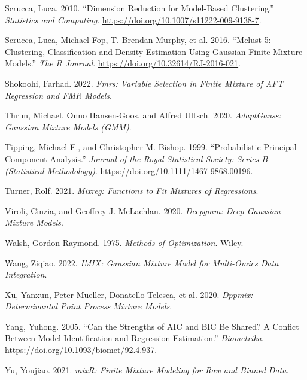 \begin{CSLReferences}{1}{0}
\leavevmode{}%
Scrucca, Luca. 2010. {``Dimension Reduction for Model-Based Clustering.''} \emph{Statistics and Computing}. \url{https://doi.org/10.1007/s11222-009-9138-7}.

\leavevmode{}%
Scrucca, Luca, Michael Fop, T. Brendan Murphy, et al. 2016. {``Mclust 5: {Clustering}, {Classification} and {Density Estimation Using Gaussian Finite Mixture Models}.''} \emph{The R Journal}. \url{https://doi.org/10.32614/RJ-2016-021}.

\leavevmode{}%
Shokoohi, Farhad. 2022. \emph{Fmrs: Variable Selection in Finite Mixture of AFT Regression and FMR Models}.

\leavevmode{}%
Thrun, Michael, Onno Hansen-Goos, and Alfred Ultsch. 2020. \emph{AdaptGauss: Gaussian Mixture Models (GMM)}.

\leavevmode{}%
Tipping, Michael E., and Christopher M. Bishop. 1999. {``Probabilistic {Principal} {Component} {Analysis}.''} \emph{Journal of the Royal Statistical Society: Series B (Statistical Methodology)}. \url{https://doi.org/10.1111/1467-9868.00196}.

\leavevmode{}%
Turner, Rolf. 2021. \emph{Mixreg: Functions to Fit Mixtures of Regressions}.

\leavevmode{}%
Viroli, Cinzia, and Geoffrey J. McLachlan. 2020. \emph{Deepgmm: Deep Gaussian Mixture Models}.

\leavevmode{}%
Walsh, Gordon Raymond. 1975. \emph{Methods of {Optimization}}. Wiley.

\leavevmode{}%
Wang, Ziqiao. 2022. \emph{IMIX: Gaussian Mixture Model for Multi-Omics Data Integration}.

\leavevmode{}%
Xu, Yanxun, Peter Mueller, Donatello Telesca, et al. 2020. \emph{Dppmix: Determinantal Point Process Mixture Models}.

\leavevmode{}%
Yang, Yuhong. 2005. {``Can the Strengths of {AIC} and {BIC} Be Shared? {A} Confict Between Model Identification and Regression Estimation.''} \emph{Biometrika}. \url{https://doi.org/10.1093/biomet/92.4.937}.

\leavevmode{}%
Yu, Youjiao. 2021. \emph{mixR: Finite Mixture Modeling for Raw and Binned Data}.

\end{CSLReferences}

